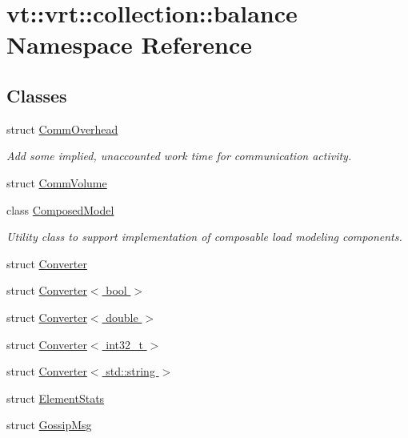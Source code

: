 \hypertarget{namespacevt_1_1vrt_1_1collection_1_1balance}{}\section{vt\+:\+:vrt\+:\+:collection\+:\+:balance Namespace Reference}
\label{namespacevt_1_1vrt_1_1collection_1_1balance}
\subsection*{Classes}
\begin{DoxyCompactItemize}
\item 
struct \hyperlink{structvt_1_1vrt_1_1collection_1_1balance_1_1_comm_overhead}{Comm\+Overhead}
\begin{DoxyCompactList}\small\item\em Add some implied, unaccounted work time for communication activity. \end{DoxyCompactList}\item 
struct \hyperlink{structvt_1_1vrt_1_1collection_1_1balance_1_1_comm_volume}{Comm\+Volume}
\item 
class \hyperlink{classvt_1_1vrt_1_1collection_1_1balance_1_1_composed_model}{Composed\+Model}
\begin{DoxyCompactList}\small\item\em Utility class to support implementation of composable load modeling components. \end{DoxyCompactList}\item 
struct \hyperlink{structvt_1_1vrt_1_1collection_1_1balance_1_1_converter}{Converter}
\item 
struct \hyperlink{structvt_1_1vrt_1_1collection_1_1balance_1_1_converter_3_01bool_01_4}{Converter$<$ bool $>$}
\item 
struct \hyperlink{structvt_1_1vrt_1_1collection_1_1balance_1_1_converter_3_01double_01_4}{Converter$<$ double $>$}
\item 
struct \hyperlink{structvt_1_1vrt_1_1collection_1_1balance_1_1_converter_3_01int32__t_01_4}{Converter$<$ int32\+\_\+t $>$}
\item 
struct \hyperlink{structvt_1_1vrt_1_1collection_1_1balance_1_1_converter_3_01std_1_1string_01_4}{Converter$<$ std\+::string $>$}
\item 
struct \hyperlink{structvt_1_1vrt_1_1collection_1_1balance_1_1_element_stats}{Element\+Stats}
\item 
struct \hyperlink{structvt_1_1vrt_1_1collection_1_1balance_1_1_gossip_msg}{Gossip\+Msg}

\end{DoxyCompactItemize}
